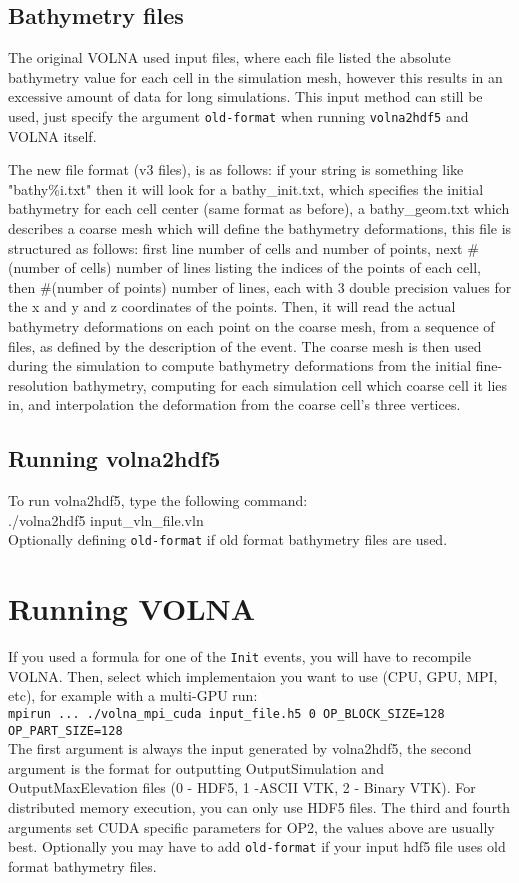 \documentclass[11pt]{article}
\begin{document}
\subsection{Bathymetry files} \label{sec/bathy}
The original VOLNA used input files, where each file listed the absolute bathymetry value for each cell in the simulation mesh, however this results in an excessive amount of data for long simulations. This input method can still be used, just specify the argument \texttt{old-format} when running \texttt{volna2hdf5} and VOLNA itself.

The new file format (v3 files), is as follows: if your string is something like "bathy\%i.txt" then it will look for a bathy\_init.txt, which specifies the initial bathymetry for each cell center (same format as before), a bathy\_geom.txt which describes a coarse mesh which will define the bathymetry deformations, this file is structured as follows: first line number of cells and number of points, next \#(number of cells) number of lines listing the indices of the points of each cell, then \#(number of points) number of lines, each with 3 double precision values for the x and y and z coordinates of the points. Then, it will read the actual bathymetry deformations on each point on the coarse mesh, from a sequence of files, as defined by the description of the event. The coarse mesh is then used during the simulation to compute bathymetry deformations from the initial fine-resolution bathymetry, computing for each simulation cell which coarse cell it lies in, and interpolation the deformation from the coarse cell's three vertices.

\subsection{Running volna2hdf5}
To run volna2hdf5, type the following command:\\
{\centering ./volna2hdf5 input\_vln\_file.vln}\\
Optionally defining \texttt{old-format} if old format bathymetry files are used.

\section{Running VOLNA} \label{sec/running}
If you used a formula for one of the \texttt{Init} events, you will have to recompile VOLNA. Then, select which implementaion you want to use (CPU, GPU, MPI, etc), for example with a multi-GPU run:\\
{\tt mpirun ... ./volna\_mpi\_cuda input\_file.h5 0 OP\_BLOCK\_SIZE=128 OP\_PART\_SIZE=128}\\
The first argument is always the input generated by volna2hdf5, the second argument is the format for outputting OutputSimulation and OutputMaxElevation files (0 - HDF5, 1 -ASCII VTK, 2 - Binary VTK). For distributed memory execution, you can only use HDF5 files. The third and fourth arguments set CUDA specific parameters for OP2, the values above are usually best. Optionally you may have to add \texttt{old-format} if your input hdf5 file uses old format bathymetry files.
\end{document}
